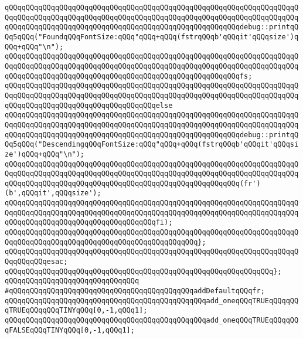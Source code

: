 \verb|qQQqqQQqqQQqqQQqqQQqqQQqqQQqqQQqqQQqqQQqqQQqqQQqqQQqqQQqqQQqqQQqqQQqqQQqqQQqqQQqqQQqqQQqqQQqqQQqqQQqqQQqqQQqqQQqqQQqqQQqqQQqqQQqqQQqqQQqqQQqqQQqqQQqqQQqqQQqqQQqqQQqqQQqqQQqqQQqqQQqqQQqqQQqqQQqqQQqdebug::printqQQq5qQQq("FoundqQQqFontSize:qQQq"qQQq+qQQq(fstrqQQqb'qQQqit'qQQqsize')qQQq+qQQq"\n");|\newline
\verb|qQQqqQQqqQQqqQQqqQQqqQQqqQQqqQQqqQQqqQQqqQQqqQQqqQQqqQQqqQQqqQQqqQQqqQQqqQQqqQQqqQQqqQQqqQQqqQQqqQQqqQQqqQQqqQQqqQQqqQQqqQQqqQQqqQQqqQQqqQQqqQQqqQQqqQQqqQQqqQQqqQQqqQQqqQQqqQQqqQQqqQQqqQQqqQQqqQQqfs;|\newline
\verb|qQQqqQQqqQQqqQQqqQQqqQQqqQQqqQQqqQQqqQQqqQQqqQQqqQQqqQQqqQQqqQQqqQQqqQQqqQQqqQQqqQQqqQQqqQQqqQQqqQQqqQQqqQQqqQQqqQQqqQQqqQQqqQQqqQQqqQQqqQQqqQQqqQQqqQQqqQQqqQQqqQQqqQQqqQQqqQQqelse|\newline
\verb|qQQqqQQqqQQqqQQqqQQqqQQqqQQqqQQqqQQqqQQqqQQqqQQqqQQqqQQqqQQqqQQqqQQqqQQqqQQqqQQqqQQqqQQqqQQqqQQqqQQqqQQqqQQqqQQqqQQqqQQqqQQqqQQqqQQqqQQqqQQqqQQqqQQqqQQqqQQqqQQqqQQqqQQqqQQqqQQqqQQqqQQqqQQqqQQqqQQqdebug::printqQQq5qQQq("DescendingqQQqFontSize:qQQq"qQQq+qQQq(fstrqQQqb'qQQqit'qQQqsize')qQQq+qQQq"\n");|\newline
\verb|qQQqqQQqqQQqqQQqqQQqqQQqqQQqqQQqqQQqqQQqqQQqqQQqqQQqqQQqqQQqqQQqqQQqqQQqqQQqqQQqqQQqqQQqqQQqqQQqqQQqqQQqqQQqqQQqqQQqqQQqqQQqqQQqqQQqqQQqqQQqqQQqqQQqqQQqqQQqqQQqqQQqqQQqqQQqqQQqqQQqqQQqqQQqqQQqqQQq(fr')(b',qQQqit',qQQqsize');|\newline
\verb|qQQqqQQqqQQqqQQqqQQqqQQqqQQqqQQqqQQqqQQqqQQqqQQqqQQqqQQqqQQqqQQqqQQqqQQqqQQqqQQqqQQqqQQqqQQqqQQqqQQqqQQqqQQqqQQqqQQqqQQqqQQqqQQqqQQqqQQqqQQqqQQqqQQqqQQqqQQqqQQqqQQqqQQqqQQqqQQqfi);|\newline
\verb|qQQqqQQqqQQqqQQqqQQqqQQqqQQqqQQqqQQqqQQqqQQqqQQqqQQqqQQqqQQqqQQqqQQqqQQqqQQqqQQqqQQqqQQqqQQqqQQqqQQqqQQqqQQqqQQqqQQq};|\newline
\verb|qQQqqQQqqQQqqQQqqQQqqQQqqQQqqQQqqQQqqQQqqQQqqQQqqQQqqQQqqQQqqQQqqQQqqQQqqQQqqQQqesac;|\newline
\verb|qQQqqQQqqQQqqQQqqQQqqQQqqQQqqQQqqQQqqQQqqQQqqQQqqQQqqQQqqQQqqQQq};|\newline
\verb|qQQqqQQqqQQqqQQqqQQqqQQqqQQqqQQq|\newline
\verb|#qQQqqQQqqQQqqQQqqQQqqQQqqQQqqQQqqQQqqQQqqQQqaddDefaultqQQqfr;|\newline
\newline
\verb|qQQqqQQqqQQqqQQqqQQqqQQqqQQqqQQqqQQqqQQqqQQqqQQqadd_oneqQQqTRUEqQQqqQQqTRUEqQQqqQQqTINYqQQq[0,-1,qQQq1];|\newline
\verb|qQQqqQQqqQQqqQQqqQQqqQQqqQQqqQQqqQQqqQQqqQQqqQQqadd_oneqQQqTRUEqQQqqQQqFALSEqQQqTINYqQQq[0,-1,qQQq1];|\newline
